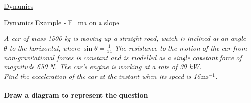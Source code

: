 \documentclass{article}[18pt]
\begin{document}
\begin{center}
\underline{\huge Dynamics}
\end{center}
\newpage
\begin{center}
\underline{\huge Dynamics Example - F=ma on a slope}
\end{center}
\textit{A car of mass 1500 kg is moving up a straight road, which is inclined at an angle $\theta$ to the
horizontal, where $\sin\theta=\frac{1}{14}$ The resistance to the motion of the car from non-gravitational
forces is constant and is modelled as a single constant force of magnitude 650 N. The car’s
engine is working at a rate of 30 kW.\\
Find the acceleration of the car at the instant when its speed is 15$\text{ms}^{-1}$. }
\\
\\
\textbf{Draw a diagram to represent the question}
\\
\\
\def\iangle{35} %
\end{document}

